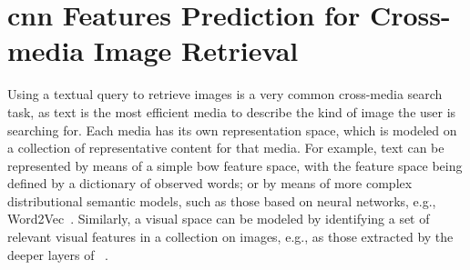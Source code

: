 
\graphicspath{{img/t2v/}}

\def\t{\mathbf{t}} %
\def\s{\mathbf{s}} %
\def\e{\mathbf{e}} %
\def\E{\mathbf{E}} %

\newcommand{\ttv}{\textsc{Text2Vis}}
\newcommand{\sparsettv}{\textsc{S-Text2Vis}}
\newcommand{\densettv}{\textsc{D-Text2Vis}}
\newcommand{\widedeepttv}{\textsc{W\&D-Text2Vis}}
\newcommand{\visreg}{\textsc{VisReg}}
\newcommand{\wordvisual}{\textsc{Word2VisualVec}}
\newcommand{\resnet}{\gls{resnet}-152}

\chapter{\gls{cnn} Features Prediction for Cross-media Image Retrieval}
\label{ch:text2vis}


Using a textual query to retrieve images is a very common cross-media search task, as text is the most efficient media to describe the kind of image the user is searching for.
Each media has its own representation space, which is modeled on a collection of representative content for that media.
For example, text can be represented by means of a simple \acrlong{bow} feature space, with the feature space being defined by a dictionary of observed words; or by means of more complex distributional semantic models, such as those based on neural networks, e.g., Word2Vec~\cite{mikolov2013distributed}.
Similarly, a visual space can be modeled by identifying a set of relevant visual features in a collection on images, e.g., as those extracted by the deeper layers of ~\cite{krizhevsky2012imagenet}.

